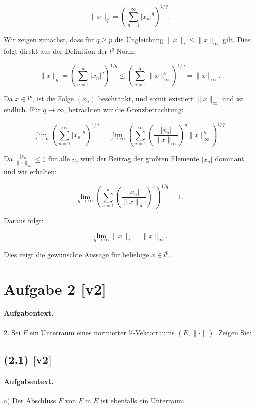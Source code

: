 \documentclass[11pt,a4paper]{article}
\begin{document}
\[
\|x\|_q = \left( \sum_{n=1}^{\infty} |x_n|^q \right)^{1/q}.
\]

Wir zeigen zunächst, dass für \( q \geq p \) die Ungleichung \( \|x\|_q \leq \|x\|_\infty \) gilt. Dies folgt direkt aus der Definition der \( l^q \)-Norm:

\[
\|x\|_q = \left( \sum_{n=1}^{\infty} |x_n|^q \right)^{1/q} \leq \left( \sum_{n=1}^{\infty} \|x\|_\infty^q \right)^{1/q} = \|x\|_\infty.
\]

Da \( x \in l^p \), ist die Folge \( (x_n) \) beschränkt, und somit existiert \( \|x\|_\infty \) und ist endlich. Für \( q \to \infty \), betrachten wir die Grenzbetrachtung:

\[
\lim_{q \to \infty} \left( \sum_{n=1}^{\infty} |x_n|^q \right)^{1/q} = \lim_{q \to \infty} \left( \sum_{n=1}^{\infty} \left( \frac{|x_n|}{\|x\|_\infty} \right)^q \|x\|_\infty^q \right)^{1/q}.
\]

Da \( \frac{|x_n|}{\|x\|_\infty} \leq 1 \) für alle \( n \), wird der Beitrag der größten Elemente \( |x_n| \) dominant, und wir erhalten:

\[
\lim_{q \to \infty} \left( \sum_{n=1}^{\infty} \left( \frac{|x_n|}{\|x\|_\infty} \right)^q \right)^{1/q} = 1.
\]

Daraus folgt:

\[
\lim_{q \to \infty} \|x\|_q = \|x\|_\infty.
\]

Dies zeigt die gewünschte Aussage für beliebige \( x \in l^p \).


\section*{Aufgabe 2 [v2]}
\paragraph{Aufgabentext.}
2. Sei $F$ ein Unterraum eines normierter $\mathbb{K}$-Vektorraums $(E,\|\cdot\|)$. Zeigen Sie:

\subsection*{(2.1) [v2]}
\paragraph{Aufgabentext.}
a) Der Abschluss $\bar{F}$ von $F$ in $E$ ist ebenfalls ein Unterraum.
\end{document}
